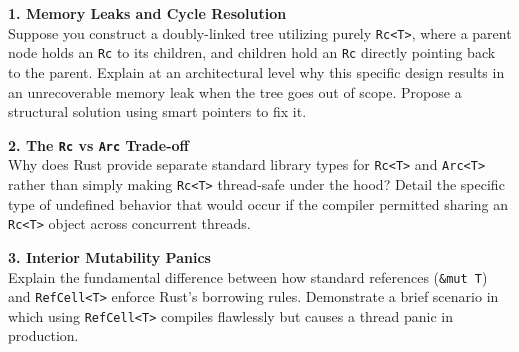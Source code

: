 \textbf{1. Memory Leaks and Cycle Resolution} \\
Suppose you construct a doubly-linked tree utilizing purely \texttt{Rc<T>}, where a parent node holds an \texttt{Rc} to its children, and children hold an \texttt{Rc} directly pointing back to the parent. Explain at an architectural level why this specific design results in an unrecoverable memory leak when the tree goes out of scope. Propose a structural solution using smart pointers to fix it.

\textbf{2. The \texttt{Rc} vs \texttt{Arc} Trade-off} \\
Why does Rust provide separate standard library types for \texttt{Rc<T>} and \texttt{Arc<T>} rather than simply making \texttt{Rc<T>} thread-safe under the hood? Detail the specific type of undefined behavior that would occur if the compiler permitted sharing an \texttt{Rc<T>} object across concurrent threads.

\textbf{3. Interior Mutability Panics} \\
Explain the fundamental difference between how standard references (\texttt{\&mut T}) and \texttt{RefCell<T>} enforce Rust's borrowing rules. Demonstrate a brief scenario in which using \texttt{RefCell<T>} compiles flawlessly but causes a thread panic in production.
